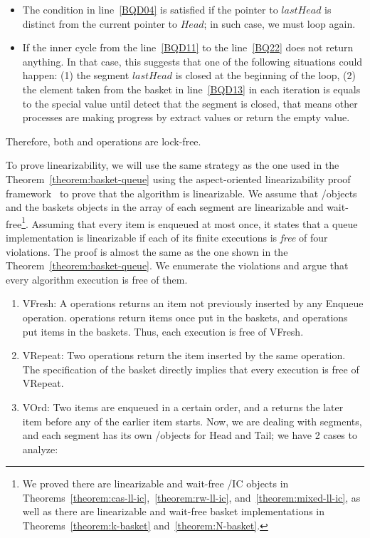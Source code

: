 \begin{proofT}
  \begin{itemize}
    \item The condition in line~\ref{BQD04} is satisfied if the pointer to \(lastHead\) is distinct from the current pointer to \(Head\); in such case, we must loop again.
    \item If the inner cycle from the line~\ref{BQD11} to the line~\ref{BQ22} does not return anything. In that case, this suggests that one of the following situations could happen: (1) the segment \(lastHead\) is closed at the beginning of the loop, (2) the element taken from the basket in line~\ref{BQD13} in each iteration is equals to the special value \closed until detect that the segment is closed, that means other processes are making progress by extract values or return the empty value.
  \end{itemize}

  Therefore, both \Enq and \Deq operations are lock-free.

  To prove linearizability, we will use the same strategy as the one used in the Theorem~\ref{theorem:basket-queue} using the aspect-oriented linearizability proof framework~\cite{DBLP_conf_concur_HenzingerSV13} to prove that the algorithm is linearizable. We assume that \LL/\IC objects and the baskets objects in the array of each segment are linearizable and wait-free\footnote{We proved there are linearizable and wait-free \LL/IC objects in Theorems~\ref{theorem:cas-ll-ic},~\ref{theorem:rw-ll-ic}, and~\ref{theorem:mixed-ll-ic}, as well as there are linearizable and wait-free basket implementations in Theorems~\ref{theorem:k-basket} and~\ref{theorem:N-basket}.}. Assuming that every item is enqueued at most once, it states that a queue implementation is linearizable if each of its finite executions is \emph{free} of four violations. The proof is almost the same as the one shown in the Theorem~\ref{theorem:basket-queue}. We enumerate the violations and argue that every algorithm execution is free of them.

  \begin{enumerate}
    \item VFresh: A \Deq operations returns an item not previously inserted by any Enqueue operation. \Deq operations return items once put in the baskets, and \Enq operations put items in the baskets. Thus, each execution is free of VFresh.
    \item VRepeat: Two \Deq operations return the item inserted by the same \Enq operation. The specification of the basket directly implies that every execution is free of VRepeat. 
    \item VOrd: Two items are enqueued in a certain order, and a \Deq returns the later item before any \Deq of the earlier item starts. Now, we are dealing with segments, and each segment has its own \LL/\IC objects for Head and Tail; we have 2 cases to analyze: 
    

\end{enumerate}
\end{proofT}
